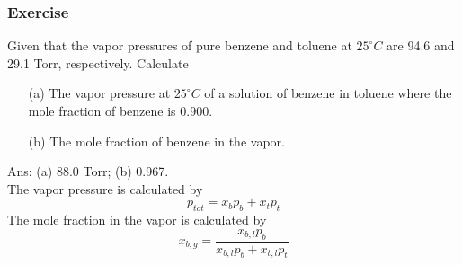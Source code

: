 \documentclass[aspectratio=169]{beamer}
\begin{document}
\begin{frame}
  \frametitle{Exercise}
  Given that the vapor pressures of pure benzene and toluene at $25^{\circ}C$ are 94.6 and 29.1 Torr, respectively. Calculate
  \begin{itemize}
    \item[(a)] The vapor pressure at $25^{\circ}C$ of a solution of benzene in toluene where the mole fraction of benzene is 0.900.
    \item[(b)] The mole fraction of benzene in the vapor. 
  \end{itemize} 
  \pause
  Ans: (a) 88.0 Torr; (b) 0.967. \\
  The vapor pressure is calculated by
  \begin{equation*}
    p_{tot} = x_{b}p_{b} + x_{t}p_{t}
  \end{equation*}
  The mole fraction in the vapor is calculated by
  \begin{equation*}
    x_{b, g} = \frac{x_{b, l}p_{b}}{x_{b, l}p_{b}+x_{t, l}p_{t}}
  \end{equation*}
\end{frame}
\end{document}
